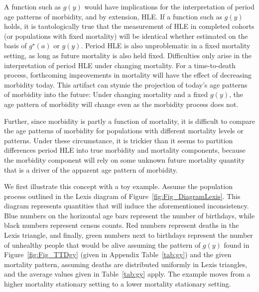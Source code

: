 \documentclass[11pt,oneside,a4paper]{article} %
\begin{document}
A function such as $g(y)$ would have implications for the interpretation of
period age patterns of morbidity, and by extension, HLE. If a function such as $g(y)$ holds, it is tautologically true that the
measurement of HLE in completed cohorts (or populations with fixed mortality)
will be identical whether estimated on the basis of $g^\star(a)$ or $g(y)$.
Period HLE is also unproblematic in a fixed mortality setting, as long as future
mortality is also held fixed. Difficulties only arise in the interpretation of
period HLE under changing mortality. For a time-to-death process, forthcoming
improvements in mortality will have the effect of decreasing morbidity today.
This artifact can stymie the projection of today's age patterns of morbidity
into the future: Under changing mortality and a fixed $g(y)$, the age pattern of
morbidity will change even as the morbidity process does not. 

Further, since morbidity is partly a function of mortality, it is difficult to
compare the age patterns of morbidity for populations with different mortality
levels or patterns. Under these circumstance, it is trickier than it seems to
partition differences period HLE into true morbidity and mortality components, because the morbidity component will rely on some unknown future mortality quantity that is a driver of the apparent age pattern of morbidity.
 
We first illustrate this concept with a toy example. Assume the population
process outlined in the Lexis diagram of Figure~\ref{fig:Fig_DiagramLexis}. This
diagram represents quantities that will induce the aforementioned inconsistency.
Blue numbers on the horizontal age bars represent the number of birthdays, while
black numbers represent census counts. Red numbers represent deaths in the
Lexis triangle, and finally, green numbers next to birthdays represent the
number of unhealthy people that would be alive assuming the pattern of $g(y)$
found in Figure~\ref{fig:Fig_TTDgy} (given in Appendix Table~\ref{tab:gy}) and
the given mortality pattern, assuming deaths are distributed uniformly in Lexis
triangles, and the average values given in Table~\ref{tab:gy} apply. The example
moves from a higher mortality stationary setting to a lower mortality stationary
setting.
\end{document}
